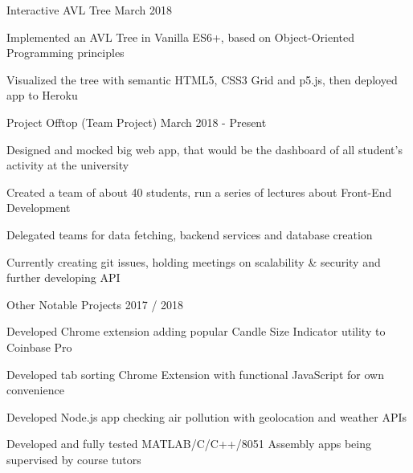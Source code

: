\begin{cventries}
\cventryproject
  {Interactive AVL Tree} %
  {March 2018} %
  {
    \begin{cvitems} %
      \item Implemented an AVL Tree in Vanilla ES6+, based on Object-Oriented Programming principles
      \item Visualized the tree with semantic HTML5, CSS3 Grid and p5.js, then deployed app to Heroku
  \end{cvitems}
  }

\cventryproject
{Project Offtop (Team Project)} %
{March 2018 - Present} %
  {
    \begin{cvitems} %
      \item Designed and mocked big web app, that would be the dashboard of all student's activity at the university
      \item Created a team of about 40 students, run a series of lectures about Front-End Development
       \item Delegated teams for data fetching, backend services and database creation
      \item Currently creating git issues, holding meetings on scalability \& security and further developing API
      \end{cvitems}
  }

\cventryproject
{Other Notable Projects} %
{2017 / 2018} %
  {
    \begin{cvitems} %
     \item Developed Chrome extension adding popular Candle Size Indicator utility to Coinbase Pro
      \item Developed tab sorting Chrome Extension with functional JavaScript for own convenience
      \item Developed Node.js app checking air pollution with geolocation and weather APIs
      \item Developed and fully tested MATLAB/C/C++/8051 Assembly apps being supervised by course tutors
  \end{cvitems}
  }

\end{cventries}

